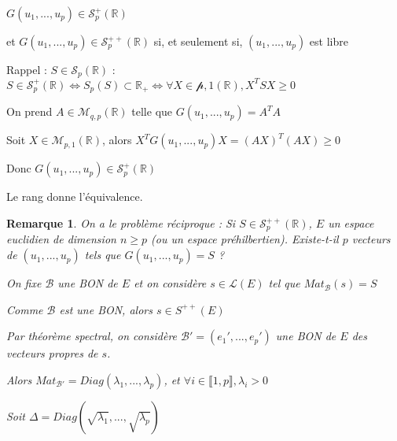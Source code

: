 \documentclass[a4paper,12pt]{book}
\newcommand{\Prop}[2]{\begin{tcolorbox}[sharp corners, colback=white,colframe=red!90!black!75, title=Proposition : #1]#2\end{tcolorbox}}
\newcommand{\Pre}[1]{\begin{tcolorbox}[sharp corners, colback=white,colframe=green!60!green!30!black!75, title=Preuve]#1\end{tcolorbox}}
\newtheorem{Rem}{Remarque}[section]
\def\R{\mathbb{R}}
\begin{document}
\Prop{}{$G(u_1,...,u_p)\in \mathcal{S}_p^+(\R)$
\par et $G(u_1,...,u_p)\in \mathcal{S}_p^{++}(\R)$ si, et seulement si, $(u_1,..., u_p)$ est libre}
\Pre{Rappel : $S\in\mathcal{S}_p(\R)$ : $S\in \mathcal{S}_p^+(\R) \Leftrightarrow S_p(S)\subset\R_+\Leftrightarrow \forall X\in\mathcal{p,1}(\R), X^TSX \geq 0$
\par On prend $A\in\mathcal{M}_{q,p}(\R)$ telle que $G(u_1,...,u_p) = A^TA$
\par Soit $X\in\mathcal{M}_{p,1}(\R)$, alors $X^TG(u_1,..., u_p)X = (AX)^T(AX)\geq 0$
\par Donc $G(u_1,..., u_p)\in\mathcal{S}_p^+(\R)$
\par Le rang donne l'équivalence.}
\begin{Rem}
On a le problème réciproque : Si $S\in\mathcal{S}_p^{++}(\R)$, $E$ un espace euclidien de dimension $n\geq p$ (ou un espace préhilbertien). Existe-t-il $p$ vecteurs de $(u_1,..., u_p)$ tels que $G(u_1,...,u_p)=S$ ?
\par On fixe $\mathcal{B}$ une BON de $E$ et on considère $s\in\mathcal{L}(E)$ tel que $Mat_\mathcal{B}(s) =S$
\par Comme $\mathcal{B}$ est une BON, alors $s\in S^{++}(E)$
\par Par théorème spectral, on considère $\mathcal{B}'=(e_1',..., e_p')$ une BON de $E$ des vecteurs propres de $s$.
\par Alors $Mat_{\mathcal{B}'} = Diag(\lambda_1,...,\lambda_p)$, et $\forall i\in\llbracket 1,p\rrbracket, \lambda_i>0$
\par Soit $\Delta = Diag(\sqrt{\lambda_1},...,\sqrt{\lambda_p})$
\end{Rem}
\end{document}
